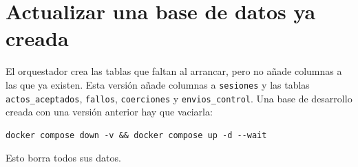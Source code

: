\section{Actualizar una base de datos ya creada}

El orquestador crea las tablas que faltan al arrancar, pero no añade columnas a las que ya existen. Esta versión añade columnas a \texttt{sesiones} y las tablas \texttt{actos\_aceptados}, \texttt{fallos}, \texttt{coerciones} y \texttt{envios\_control}. Una base de desarrollo creada con una versión anterior hay que vaciarla:

\begin{verbatim}
docker compose down -v && docker compose up -d --wait
\end{verbatim}

Esto borra todos sus datos.
